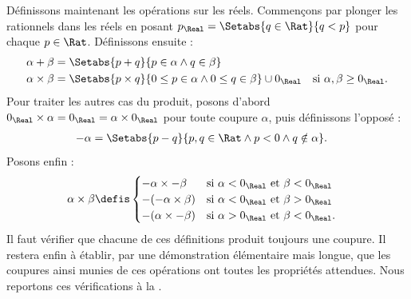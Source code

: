 \documentclass[../../../include/open-logic-section]{subfiles}
\begin{document}
Définissons maintenant les opérations sur les réels. Commençons par
plonger les rationnels dans les réels en posant
$p_\Real = \Setabs{q \in \Rat}{q < p}$ pour chaque $p \in \Rat$.
Définissons ensuite :
\begin{align*}
	\alpha + \beta &= \Setabs{p + q}{p \in \alpha \land q \in \beta}\\
	\alpha \times \beta &=
	\Setabs{p \times q}{0 \leq p \in \alpha \land 0 \leq q \in \beta} \cup 0_\Real & \text{si }\alpha, \beta \geq 0_\Real.
\end{align*}
Pour traiter les autres cas du produit, posons d'abord
$0_\Real \times \alpha = 0_\Real = \alpha \times 0_\Real$ pour toute
coupure $\alpha$, puis définissons l'opposé :
%
\begin{align*}
	-\alpha &= \Setabs{p - q}{p,q \in \Rat \land p < 0 \land q \notin \alpha}.
\end{align*}
Posons enfin :
\begin{align*}
	\alpha \times \beta &\defis
	\begin{cases}
		\mathord{-}\alpha \times \mathord{-}\beta &\text{si }\alpha < 0_\Real\text{ et }\beta < 0_\Real\\
		\mathord{-}(\mathord{-}\alpha \times \beta) &\text{si }\alpha < 0_\Real \text{ et }\beta > 0_\Real\\
		\mathord{-}(\alpha \times \mathord{-}\beta) &\text{si }\alpha > 0_\Real \text{ et }\beta < 0_\Real.
	\end{cases}
\end{align*}
Il faut vérifier que chacune de ces définitions produit toujours une
coupure. Il restera enfin à établir, par une démonstration élémentaire
mais longue, que les coupures ainsi munies de ces opérations ont toutes
les propriétés attendues. Nous reportons ces vérifications à la
.
\end{document}

